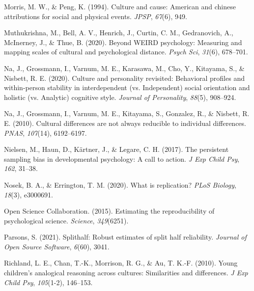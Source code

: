 \documentclass[
  man,floatsintext]{apa6}
\newlength{\cslhangindent}
\newlength{\cslentryspacingunit} %
\newenvironment{CSLReferences}[2] %
 {%
  \setlength{\parindent}{0pt}
  \ifodd #1
  \let\oldpar\par
  \def\par{\hangindent=\cslhangindent\oldpar}
  \fi
  \setlength{\parskip}{#2\cslentryspacingunit}
 }%
 {}
\begin{document}
\begin{CSLReferences}{1}{0}
\leavevmode{}%
Morris, M. W., \& Peng, K. (1994). Culture and cause: American and chinese attributions for social and physical events. \emph{JPSP}, \emph{67}(6), 949.

\leavevmode{}%
Muthukrishna, M., Bell, A. V., Henrich, J., Curtin, C. M., Gedranovich, A., McInerney, J., \& Thue, B. (2020). Beyond WEIRD psychology: Measuring and mapping scales of cultural and psychological distance. \emph{Psych Sci}, \emph{31}(6), 678--701.

\leavevmode{}%
Na, J., Grossmann, I., Varnum, M. E., Karasawa, M., Cho, Y., Kitayama, S., \& Nisbett, R. E. (2020). Culture and personality revisited: Behavioral profiles and within-person stability in interdependent (vs. Independent) social orientation and holistic (vs. Analytic) cognitive style. \emph{Journal of Personality}, \emph{88}(5), 908--924.

\leavevmode{}%
Na, J., Grossmann, I., Varnum, M. E., Kitayama, S., Gonzalez, R., \& Nisbett, R. E. (2010). Cultural differences are not always reducible to individual differences. \emph{PNAS}, \emph{107}(14), 6192--6197.

\leavevmode{}%
Nielsen, M., Haun, D., Kärtner, J., \& Legare, C. H. (2017). The persistent sampling bias in developmental psychology: A call to action. \emph{J Exp Child Psy}, \emph{162}, 31--38.

\leavevmode{}%
Nosek, B. A., \& Errington, T. M. (2020). What is replication? \emph{PLoS Biology}, \emph{18}(3), e3000691.

\leavevmode{}%
Open Science Collaboration. (2015). Estimating the reproducibility of psychological science. \emph{Science}, \emph{349}(6251).

\leavevmode{}%
Parsons, S. (2021). Splithalf: Robust estimates of split half reliability. \emph{Journal of Open Source Software}, \emph{6}(60), 3041.

\leavevmode{}%
Richland, L. E., Chan, T.-K., Morrison, R. G., \& Au, T. K.-F. (2010). Young children's analogical reasoning across cultures: Similarities and differences. \emph{J Exp Child Psy}, \emph{105}(1-2), 146--153.


\end{CSLReferences}
\end{document}

